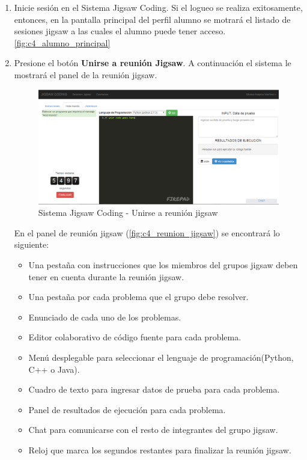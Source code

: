 \begin{enumerate}
	\item Inicie sesión en el Sistema Jigsaw Coding. Si el logueo se realiza exitosamente, entonces, en la pantalla principal del perfil alumno se motrará el listado de sesiones jigsaw a las cuales el alumno puede tener acceso.\autoref{fig:c4_alumno_principal}
	\item Presione el botón \textbf{Unirse a reunión Jigsaw}. A continuación el sistema le mostrará el panel de la reunión jigsaw. 
	
	\begin{figure}[h!]
		\centering
		\caption{Sistema Jigsaw Coding - Unirse a reunión jigsaw}
		\label{fig:c4_reunion_jigsaw}
		\includegraphics[scale=0.4]{figuras/usodelsistema/alumno/reunion_jigsaw}
	\end{figure}
	
	En el panel de reunión jigsaw  (\autoref{fig:c4_reunion_jigsaw}) se encontrará lo siguiente: 
	
	\begin{itemize}
		\item Una pestaña con instrucciones que los miembros del grupos jigsaw deben tener en cuenta durante la reunión jigsaw.
		\item Una pestaña por cada problema que el grupo debe resolver.
		\item Enunciado de cada uno de los problemas.
		\item Editor colaborativo de código fuente para cada problema.
		\item Menú desplegable para seleccionar el lenguaje de programación(Python, C++ o Java).
		\item Cuadro de texto para ingresar datos de prueba para cada problema.
		\item Panel de resultados de ejecución para cada problema.
		\item Chat para comunicarse con el resto de integrantes del grupo jigsaw.
		\item Reloj que marca los segundos restantes para finalizar la reunión jigsaw.
	\end{itemize}
\end{enumerate}

